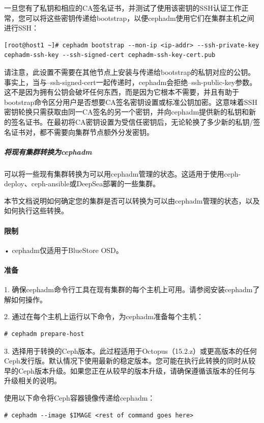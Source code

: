 \documentclass[12pt,UTF8]{ctexbook}
\begin{document}
一旦您有了私钥和相应的CA签名证书，并测试了使用该密钥的SSH认证工作正常，您可以将这些密钥传递给bootstrap，以便cephadm使用它们在集群主机之间进行SSH：
\begin{verbatim}
[root@host1 ~]# cephadm bootstrap --mon-ip <ip-addr> --ssh-private-key cephadm-ssh-key --ssh-signed-cert cephadm-ssh-key-cert.pub
\end{verbatim}

请注意，此设置不需要在其他节点上安装与传递给bootstrap的私钥对应的公钥。事实上，当与--ssh-signed-cert一起传递时，cephadm会拒绝--ssh-public-key参数。这不是因为拥有公钥会破坏任何东西，而是因为它根本不需要，并且有助于bootstrap命令区分用户是否想要CA签名密钥设置或标准公钥加密。这意味着SSH密钥轮换只需获取由同一CA签名的另一个密钥，并向cephadm提供新的私钥和新的签名证书。在最初将CA密钥设置为受信任密钥后，无论轮换了多少新的私钥/签名证书对，都不需要向集群节点额外分发密钥。

\subparagraph{将现有集群转换为cephadm}

可以将一些现有集群转换为可以用cephadm管理的状态。这适用于使用ceph-deploy、ceph-ansible或DeepSea部署的一些集群。

本节文档说明如何确定您的集群是否可以转换为可以由cephadm管理的状态，以及如何执行这些转换。

\paragraph{限制}

• cephadm仅适用于BlueStore OSD。

\paragraph{准备}

1. 确保cephadm命令行工具在现有集群的每个主机上可用。请参阅安装cephadm了解如何操作。

2. 通过在每个主机上运行以下命令，为cephadm准备每个主机：
\begin{verbatim}
# cephadm prepare-host
\end{verbatim}

3. 选择用于转换的Ceph版本。此过程适用于Octopus（15.2.z）或更高版本的任何Ceph发行版。默认情况下使用最新的稳定版本。您可能在执行此转换的同时从较早的Ceph版本升级。如果您正在从较早的版本升级，请确保遵循该版本的任何与升级相关的说明。

使用以下命令将Ceph容器镜像传递给cephadm：
\begin{verbatim}
# cephadm --image $IMAGE <rest of command goes here>
\end{verbatim}
\end{document}
